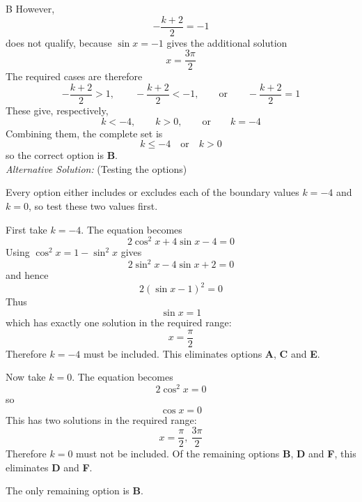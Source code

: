 \documentclass[11pt,a4paper]{article}
\begin{document}
\begin{enumerate}[label=\textbf{\arabic*.},leftmargin=*,itemsep=0pt,start=17]
\begin{djsSolution}{B}
However,
\[
-\frac{k+2}{2}=-1
\]
does not qualify, because \(\sin x=-1\) gives the additional solution
\[
x=\frac{3\pi}{2}
\]
The required cases are therefore
\[
-\frac{k+2}{2}>1,\qquad
-\frac{k+2}{2}<-1,
\qquad\text{or}\qquad
-\frac{k+2}{2}=1
\]
These give, respectively,
\[
k<-4,\qquad k>0,
\qquad\text{or}\qquad k=-4
\]
Combining them, the complete set is
\[
k\leq -4 \quad\text{or}\quad k>0
\]
so the correct option is \textbf{B}. \\[5pt]


\textit{Alternative Solution:} (Testing the options)

Every option either includes or excludes each of the boundary values $k=-4$ and $k=0$, so test these two values first.

First take $k=-4$. The equation becomes
\[
2\cos^2x+4\sin x-4=0
\]
Using $\cos^2x=1-\sin^2x$ gives
\[
2\sin^2x-4\sin x+2=0
\]
and hence
\[
2(\sin x-1)^2=0
\]
Thus
\[
\sin x=1
\]
which has exactly one solution in the required range:
\[
x=\frac{\pi}{2}
\]
Therefore $k=-4$ must be included. This eliminates options \textbf{A}, \textbf{C} and \textbf{E}.

Now take $k=0$. The equation becomes
\[
2\cos^2x=0
\]
so
\[
\cos x=0
\]
This has two solutions in the required range:
\[
x=\frac{\pi}{2},\ \frac{3\pi}{2}
\]
Therefore $k=0$ must not be included. Of the remaining options \textbf{B}, \textbf{D} and \textbf{F}, this eliminates \textbf{D} and \textbf{F}.

The only remaining option is \textbf{B}.
\end{djsSolution}
\end{enumerate}
\clearpage
\thispagestyle{djssolutions}
\vspace*{8pt}
\end{document}
